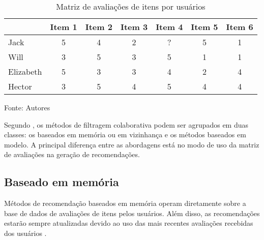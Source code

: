     
    \begin{table}[htb]
        
        \caption{Matriz de avaliações de itens por usuários}
        \label{tab:matriz-av-item-user}
        \begin{tabular}{@{}lcccccc@{}}
        \toprule
                  & Item 1 & Item 2 & Item 3 & Item 4 & Item 5 & Item 6 \\ \midrule
        Jack      & 5      & 4      & 2      & ?      & 5      & 1      \\
        Will      & 3      & 5      & 3      & 5      & 1      & 1      \\
        Elizabeth & 5      & 3      & 3      & 4      & 2      & 4      \\
        Hector    & 3      & 5      & 4      & 5      & 4      & 4      \\ \bottomrule
        \end{tabular}
        
        \footnotesize{Fonte: Autores}
    \end{table}
    
    Segundo , os métodos de filtragem colaborativa podem ser agrupados em duas classes: os baseados em memória ou em vizinhança e os métodos baseados em modelo. A principal diferença entre as abordagens está no modo de uso da matriz de avaliações na geração de recomendações. 
    
    
        
    \subsection{Baseado em memória}
        
        Métodos de recomendação baseados em memória operam diretamente sobre a base de dados de avaliações de itens pelos usuários. Além disso, as recomendações estarão sempre atualizadas devido ao uso das mais recentes avaliações recebidas dos usuários \cite{Bobadilla_2013}. 
        
        
